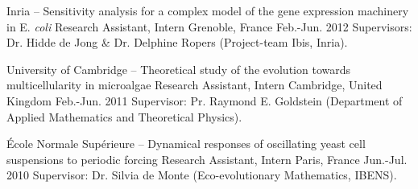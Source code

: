 
\begin{cventries}
  \cventry
    {Inria -- Sensitivity analysis for a complex model of the gene expression machinery in E. \textit{coli}} %
    {Research Assistant, Intern} %
    {Grenoble, France} %
    {Feb.-Jun. 2012} %
    {
    Supervisors: Dr. Hidde de Jong \& Dr. Delphine Ropers (Project-team Ibis, Inria).
    }
    
  \cventry
    {University of Cambridge -- Theoretical study of the evolution towards multicellularity in microalgae} %
    {Research Assistant, Intern} %
    {Cambridge, United Kingdom} %
    {Feb.-Jun. 2011} %
    {
	Supervisor: Pr. Raymond E. Goldstein (Department of Applied Mathematics and Theoretical Physics).
    }
    
  \cventry
    {École Normale Supérieure -- Dynamical responses of oscillating yeast cell suspensions to periodic forcing} %
    {Research Assistant, Intern} %
    {Paris, France} %
    {Jun.-Jul. 2010} %
    {
	Supervisor: Dr. Silvia de Monte (Eco-evolutionary Mathematics, IBENS).
    }

\end{cventries}
